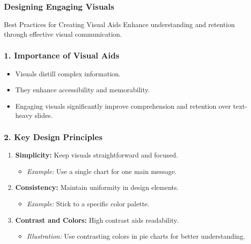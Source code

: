 \documentclass{beamer}
\begin{document}
\begin{frame}[fragile]
    \frametitle{Designing Engaging Visuals}
    \begin{block}{Best Practices for Creating Visual Aids}
        Enhance understanding and retention through effective visual communication.
    \end{block}
\end{frame}

\begin{frame}[fragile]
    \frametitle{1. Importance of Visual Aids}
    \begin{itemize}
        \item Visuals distill complex information.
        \item They enhance accessibility and memorability.
        \item Engaging visuals significantly improve comprehension and retention over text-heavy slides.
    \end{itemize}
\end{frame}

\begin{frame}[fragile]
    \frametitle{2. Key Design Principles}
    \begin{enumerate}
        \item \textbf{Simplicity:} Keep visuals straightforward and focused. 
            \begin{itemize}
                \item \textit{Example:} Use a single chart for one main message.
            \end{itemize}
        \item \textbf{Consistency:} Maintain uniformity in design elements.
            \begin{itemize}
                \item \textit{Example:} Stick to a specific color palette.
            \end{itemize}
        \item \textbf{Contrast and Colors:} High contrast aids readability.
            \begin{itemize}
                \item \textit{Illustration:} Use contrasting colors in pie charts for better understanding.
            \end{itemize}
    \end{enumerate}
\end{frame}
\end{document}
